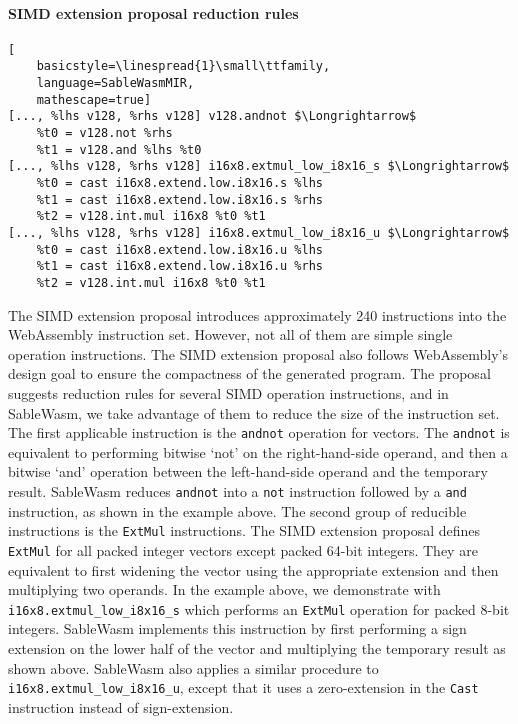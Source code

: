 \paragraph{SIMD extension proposal reduction rules} \quad
\begin{lstlisting}[
    basicstyle=\linespread{1}\small\ttfamily, 
    language=SableWasmMIR, 
    mathescape=true]
[..., %lhs v128, %rhs v128] v128.andnot $\Longrightarrow$
    %t0 = v128.not %rhs 
    %t1 = v128.and %lhs %t0
[..., %lhs v128, %rhs v128] i16x8.extmul_low_i8x16_s $\Longrightarrow$
    %t0 = cast i16x8.extend.low.i8x16.s %lhs
    %t1 = cast i16x8.extend.low.i8x16.s %rhs
    %t2 = v128.int.mul i16x8 %t0 %t1
[..., %lhs v128, %rhs v128] i16x8.extmul_low_i8x16_u $\Longrightarrow$
    %t0 = cast i16x8.extend.low.i8x16.u %lhs
    %t1 = cast i16x8.extend.low.i8x16.u %rhs
    %t2 = v128.int.mul i16x8 %t0 %t1
\end{lstlisting}
The SIMD extension proposal introduces approximately 240 instructions into the
WebAssembly instruction set. However, not all of them are simple single
operation instructions. The SIMD extension proposal also follows WebAssembly's
design goal to ensure the compactness of the generated program. The proposal
suggests reduction rules for several SIMD operation instructions, and in
SableWasm, we take advantage of them to reduce the size of the instruction set.
The first applicable instruction is the \texttt{andnot} operation for vectors.
The \texttt{andnot} is equivalent to performing bitwise `not' on the
right-hand-side operand, and then a bitwise `and' operation between the
left-hand-side operand and the temporary result. SableWasm reduces
\texttt{andnot} into a \texttt{not} instruction followed by a \texttt{and}
instruction, as shown in the example above. The second group of reducible
instructions is the \texttt{ExtMul} instructions. The SIMD extension proposal
defines \texttt{ExtMul} for all packed integer vectors except packed 64-bit
integers. They are equivalent to first widening the vector using the appropriate
extension and then multiplying two operands. In the example above, we
demonstrate with \texttt{i16x8.extmul\_low\_i8x16\_s} which performs an
\texttt{ExtMul} operation for packed 8-bit integers. SableWasm implements this
instruction by first performing a sign extension on the lower half of the vector
and multiplying the temporary result as shown above. SableWasm also applies a
similar procedure to \texttt{i16x8.extmul\_low\_i8x16\_u}, except that it uses
a zero-extension in the \texttt{Cast} instruction instead of sign-extension.

